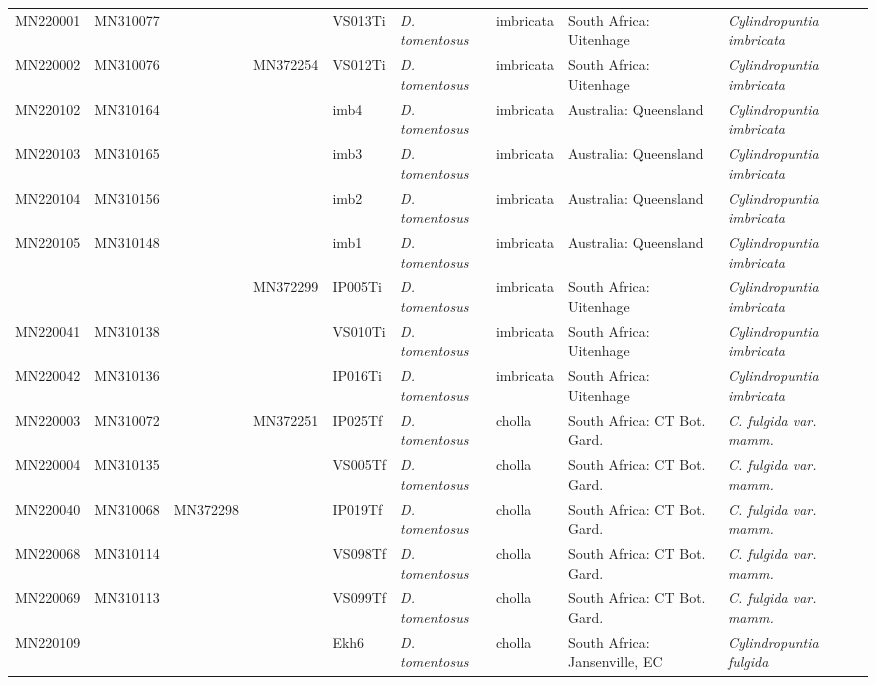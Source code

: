 \begin{landscape}
{\begin{longtable}{@{}lllllp{2.7cm}p{2.2cm}p{5cm}p{4cm}@{}}
MN220001 & MN310077 &  &  & VS013Ti & \textit{D. tomentosus} & imbricata & South Africa: Uitenhage & \textit{Cylindropuntia imbricata} \\
MN220002 & MN310076 &  & MN372254 & VS012Ti & \textit{D. tomentosus} & imbricata & South Africa: Uitenhage & \textit{Cylindropuntia imbricata} \\
MN220102 & MN310164 &  &  & imb4 & \textit{D. tomentosus} & imbricata & Australia: Queensland & \textit{Cylindropuntia imbricata} \\
MN220103 & MN310165 &  &  & imb3 & \textit{D. tomentosus} & imbricata & Australia: Queensland & \textit{Cylindropuntia imbricata} \\
MN220104 & MN310156 &  &  & imb2 & \textit{D. tomentosus} & imbricata & Australia: Queensland & \textit{Cylindropuntia imbricata} \\
MN220105 & MN310148 &  &  & imb1 & \textit{D. tomentosus} & imbricata & Australia: Queensland & \textit{Cylindropuntia imbricata} \\
 &  &  & MN372299 & IP005Ti & \textit{D. tomentosus} & imbricata & South Africa: Uitenhage & \textit{Cylindropuntia imbricata} \\
MN220041 & MN310138 &  &  & VS010Ti & \textit{D. tomentosus} & imbricata & South Africa: Uitenhage & \textit{Cylindropuntia imbricata} \\
MN220042 & MN310136 &  &  & IP016Ti & \textit{D. tomentosus} & imbricata & South Africa: Uitenhage & \textit{Cylindropuntia imbricata} \\
MN220003 & MN310072 &  & MN372251 & IP025Tf & \textit{D. tomentosus} & cholla & South Africa: CT Bot. Gard. & \textit{C. fulgida var. mamm.} \\
MN220004 & MN310135 &  &  & VS005Tf & \textit{D. tomentosus} & cholla & South Africa: CT Bot. Gard. & \textit{C. fulgida var. mamm.} \\
MN220040 & MN310068 & MN372298 &  & IP019Tf & \textit{D. tomentosus} & cholla & South Africa: CT Bot. Gard. & \textit{C. fulgida var. mamm.} \\
MN220068 & MN310114 &  &  & VS098Tf & \textit{D. tomentosus} & cholla & South Africa: CT Bot. Gard. & \textit{C. fulgida var. mamm.} \\
MN220069 & MN310113 &  &  & VS099Tf & \textit{D. tomentosus} & cholla & South Africa: CT Bot. Gard. & \textit{C. fulgida var. mamm.} \\
MN220109 &  &  &  & Ekh6 & \textit{D. tomentosus} & cholla & South Africa: Jansenville, EC & \textit{Cylindropuntia fulgida} \\

\end{longtable}}
\end{landscape}
